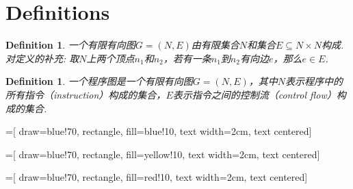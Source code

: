 \documentclass{article}
\newtheorem{definition}[theorem]{Definition}
\begin{document}
\section{Definitions}

\begin{definition}
\rm 一个有限有向图$G=(N,E)$由有限集合$N$和集合$E \subseteq N \times N$构成. 对定义的补充: 取$N$上两个顶点$n_1$和$n_2$，若有一条$n_1$到$n_2$有向边$e$，那么$e \in E$. 
\end{definition}

\begin{definition}
\rm 一个程序图是一个有限有向图$G=(N,E)$，其中$N$表示程序中的所有指令（instruction）构成的集合，$E$表示指令之间的控制流（control flow）构成的集合.
\end{definition}
 
=[
    draw=blue!70,   %
    rectangle,      %
    fill=blue!10,   %
    text width=2cm,
    text centered]
    
=[
    draw=blue!70,   %
    rectangle,      %
    fill=yellow!10,   %
    text width=2cm,
    text centered]
    
=[
    draw=blue!70,   %
    rectangle,      %
    fill=red!10,   %
    text width=2cm,
    text centered]     	
    
\end{document}
